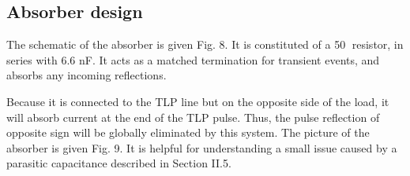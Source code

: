 \subsection{Absorber design}

The schematic of the absorber is given Fig. 8.
It is constituted of a 50 resistor, in series with 6.6 nF.
It acts as a matched termination for transient events, and absorbs any incoming reflections.


Because it is connected to the TLP line but on the opposite side of the load, it will absorb current at the end of the TLP pulse.
Thus, the pulse reflection of opposite sign will be globally eliminated by this system.
The picture of the absorber is given Fig. 9.
It is helpful for understanding a small issue caused by a parasitic capacitance described in Section II.5.

